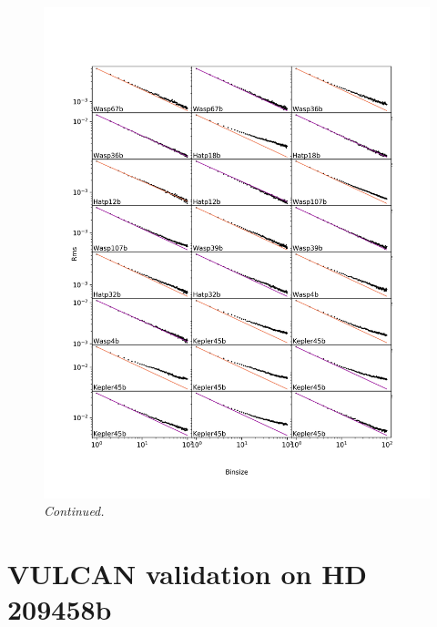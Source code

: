 \begin{subappendices}
  \addtocounter{figure}{-1}
  \begin{figure}
    \includegraphics[width=\textwidth]{rmsVsbinsize2.pdf}
    \caption{\textit{Continued.}}
  \end{figure}


  \section{VULCAN validation on HD 209458b}


\end{subappendices}
